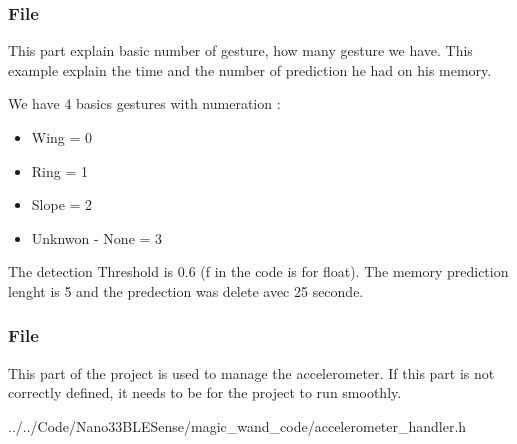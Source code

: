 \subsubsection{File }

This part explain basic number of gesture, how many gesture we have. This example explain the time and the number  of prediction he had on his memory.  

\bigskip

We have 4 basics gestures with numeration : 

\begin{itemize}
    \item Wing = 0  
    \item Ring = 1
    \item Slope = 2
    \item Unknwon - None = 3	
\end{itemize} 

\begin{center}
    \label{MagicWandConstant}
\end{center}

The detection Threshold is 0.6 (f in the code is for float). The memory prediction lenght is 5 and the predection was delete avec 25 seconde. 

\begin{center}
    \label{Magic Wand Constant}
\end{center}


\subsubsection{File }

This part of the project is used to manage the accelerometer. If this part is not correctly defined, it needs to be for the project to run smoothly. 

\begin{center}
    \label{Figure:MagicWandAccelerometerhandler}
     {../../Code/Nano33BLESense/magic_wand_code/accelerometer_handler.h}	
\end{center}


